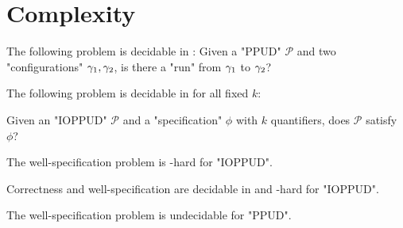 \section{Complexity}
\label{sec:complexity}

\begin{proposition}
	The following problem is decidable in \pspace:
	Given a "PPUD" $\mathcal{P}$ and two "configurations" $\gamma_1, \gamma_2$, is there a "run" from $\gamma_1$ to $\gamma_2$?
\end{proposition}




\begin{theorem}
	The following problem is decidable in \exps for all fixed $k$:
	
	Given an "IOPPUD" $\mathcal{P}$ and a "specification" $\phi$ with $k$ quantifiers, does $\mathcal{P}$ satisfy $\phi$?
\end{theorem}

\begin{theorem}
	The well-specification problem is \nexpt-hard for "IOPPUD".
\end{theorem}

\begin{corollary}
	Correctness and well-specification are decidable in \exps and \nexpt-hard for "IOPPUD".
\end{corollary}

\begin{theorem}
	The well-specification problem is undecidable for "PPUD".
\end{theorem}
